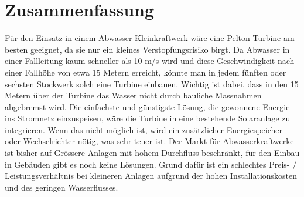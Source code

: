 \section{Zusammenfassung}

Für den Einsatz in einem Abwasser Kleinkraftwerk wäre eine Pelton-Turbine am besten geeignet, da sie nur ein kleines Verstopfungsrisiko birgt. Da Abwasser in einer Fallleitung kaum schneller als 10 m/s wird und diese Geschwindigkeit nach einer Fallhöhe von etwa 15 Metern erreicht, könnte man in jedem fünften oder sechsten Stockwerk solch eine Turbine einbauen. Wichtig ist dabei, dass in den 15 Metern über der Turbine das Wasser nicht durch bauliche Massnahmen abgebremst wird. Die einfachste und günstigste Lösung, die gewonnene Energie ins Stromnetz einzuspeisen, wäre die Turbine in eine bestehende Solaranlage zu integrieren. Wenn das nicht möglich ist, wird ein zusätzlicher Energiespeicher oder Wechselrichter nötig, was sehr teuer ist. Der Markt für Abwasserkraftwerke ist bisher auf Grössere Anlagen mit hohem Durchfluss beschränkt, für den Einbau in Gebäuden gibt es noch keine Lösungen. Grund dafür ist ein schlechtes Preis- / Leistungsverhältnis bei kleineren Anlagen aufgrund der hohen Installationskosten und des geringen Wasserflusses.